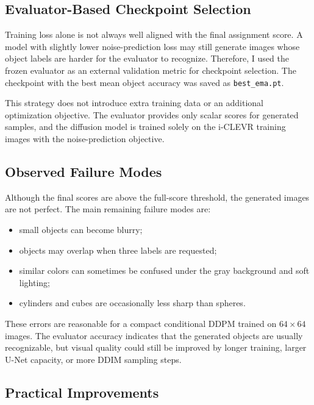\documentclass[12pt,a4paper]{article}
\begin{document}
\subsection{Evaluator-Based Checkpoint Selection}

Training loss alone is not always well aligned with the final assignment score.
A model with slightly lower noise-prediction loss may still generate images
whose object labels are harder for the evaluator to recognize.  Therefore, I
used the frozen evaluator as an external validation metric for checkpoint
selection.  The checkpoint with the best mean object accuracy was saved as
\texttt{best\_ema.pt}.

This strategy does not introduce extra training data or an additional
optimization objective.  The evaluator provides only scalar scores for generated
samples, and the diffusion model is trained solely on the i-CLEVR training
images with the noise-prediction objective.

\subsection{Observed Failure Modes}

Although the final scores are above the full-score threshold, the generated
images are not perfect.  The main remaining failure modes are:
\begin{itemize}
    \item small objects can become blurry;
    \item objects may overlap when three labels are requested;
    \item similar colors can sometimes be confused under the gray background
          and soft lighting;
    \item cylinders and cubes are occasionally less sharp than spheres.
\end{itemize}
These errors are reasonable for a compact conditional DDPM trained on
$64 \times 64$ images.  The evaluator accuracy indicates that the generated
objects are usually recognizable, but visual quality could still be improved by
longer training, larger U-Net capacity, or more DDIM sampling steps.

\subsection{Practical Improvements}
\end{document}
